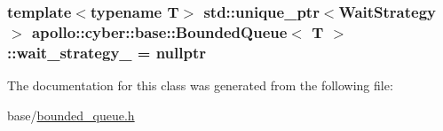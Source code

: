 \hypertarget{classapollo_1_1cyber_1_1base_1_1BoundedQueue_a123bf235b77d2927e4319b0ceb3dc45c}{
\subsubsection[{wait\-\_\-strategy\-\_\-}]{\setlength{\rightskip}{0pt plus 5cm}template$<$typename T$>$ std\-::unique\-\_\-ptr$<${\bf Wait\-Strategy}$>$ {\bf apollo\-::cyber\-::base\-::\-Bounded\-Queue}$<$ T $>$\-::wait\-\_\-strategy\-\_\- = nullptr\hspace{0.3cm}{\ttfamily [private]}}}\label{classapollo_1_1cyber_1_1base_1_1BoundedQueue_a123bf235b77d2927e4319b0ceb3dc45c}


The documentation for this class was generated from the following file\-:\begin{DoxyCompactItemize}
\item 
base/\hyperlink{bounded__queue_8h}{bounded\-\_\-queue.\-h}\end{DoxyCompactItemize}
